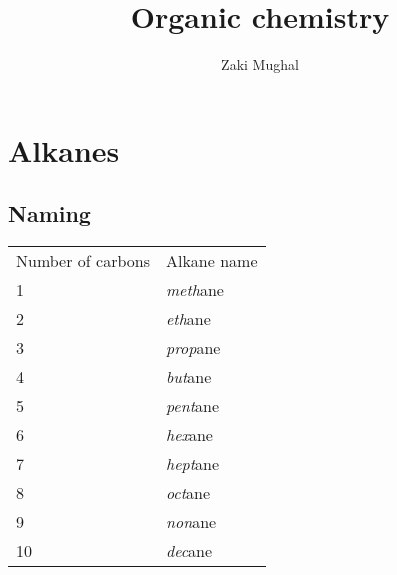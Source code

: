 
\title{Organic chemistry}
\author{Zaki Mughal}
\date{}

\maketitle

\section{Alkanes}

\subsection{Naming}

\begin{table}
\begin{tabular}{ll}
Number of carbons & Alkane name    \\
1                 & \emph{meth}ane \\
2                 & \emph{eth}ane  \\
3                 & \emph{prop}ane \\
4                 & \emph{but}ane  \\
5                 & \emph{pent}ane \\
6                 & \emph{hex}ane  \\
7                 & \emph{hept}ane \\
8                 & \emph{oct}ane  \\
9                 & \emph{non}ane  \\
10                & \emph{dec}ane  \\
\end{tabular}
\end{table}




